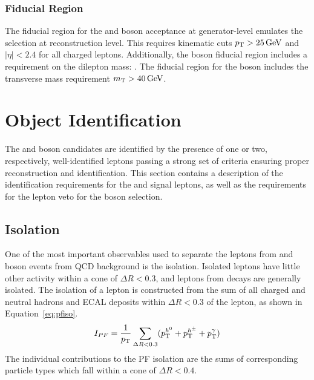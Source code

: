 \subsubsection{Fiducial Region}
The fiducial region for the \Wpm and \Z boson acceptance at generator-level emulates the selection at reconstruction level. This requires kinematic cuts $p_{\mathrm{T}} > 25 \,\text{Ge\hspace{-.08em}V}$ and $|\eta| < 2.4$ for all charged leptons. Additionally, the \Z boson fiducial region includes a requirement on the dilepton mass: \masswindow. The fiducial region for the \W boson includes the transverse mass requirement $m_{\mathrm{T}}>40\,\text{Ge\hspace{-.08em}V}$.


\section{Object Identification}\label{ch:IdIso}
The \W and \Z boson candidates are identified by the presence of one or two, respectively, well-identified leptons passing a strong set of criteria ensuring proper reconstruction and identification. This section contains a description of the identification requirements for the \wlnu and \zll signal leptons, as well as the requirements for the lepton veto for the \Wpm boson selection.

\subsection{Isolation}\label{ch:id:iso}
One of the most important observables used to separate the leptons from \Wp and \Wm boson events from QCD background is the isolation. Isolated leptons have little other activity within a cone of $\Delta R < 0.3$, and leptons from \wlnu decays are generally isolated. The isolation of a lepton is constructed from the sum of all charged and neutral hadrons and ECAL deposits within $\Delta R < 0.3$ of the lepton, as shown in Equation~\ref{eq:pfiso}. 
\begin{equation}
    I_{PF} = \frac{1}{p_{\mathrm{T}}}\sum_{\Delta R<0.3}( p_{\mathrm{T}}^{h^0} + p_{\mathrm{T}}^{h^\pm} +  p_{\mathrm{T}}^{\gamma})
    \label{eq:pfiso}
\end{equation}
The individual contributions to the PF isolation are the sums of corresponding particle types which fall within a cone of $\Delta R < 0.4$.

